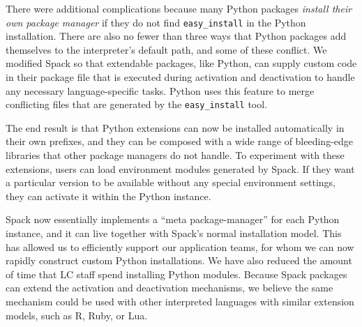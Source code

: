 There were additional complications because many Python packages {\it install their own
package manager} if they do not find {\tt easy\_install} in the Python installation.
There are also no fewer than three ways that Python packages add themselves to the
interpreter's default path, and some of these conflict. We modified Spack so that 
extendable packages, like Python, can supply custom code in their package file that is
executed during activation and deactivation to handle any necessary language-specific tasks.
Python uses this feature to merge conflicting files that are generated by the {\tt easy\_install} tool.

The end result is that Python extensions can now be installed automatically
in their own prefixes, and they can be composed with a wide range
of bleeding-edge libraries that other package managers do not handle.  To experiment
with these extensions, users can load environment modules generated by Spack.
If they want a particular version to be available without any special environment 
settings, they can activate it within the Python instance.

Spack now essentially implements a ``meta package-manager'' for each Python
instance, and it can live together with Spack's normal installation model.
This has allowed us to efficiently support our application teams, for whom we can
now rapidly construct custom Python installations.  We have also reduced
the amount of time that LC staff spend installing Python modules.
Because Spack packages can extend the activation and deactivation mechanisms,
we believe the same mechanism could be used with other 
interpreted languages with similar extension models, such as R, Ruby, or Lua.

